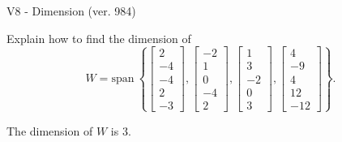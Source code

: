 \begin{exercise}
  \begin{exerciseTitle}V8 - Dimension (ver. 984)\end{exerciseTitle}
  \begin{exerciseStatement}
    Explain how to find the dimension of 
\[W=\mathrm{span}\ \left\{\left[\begin{array}{r}
2 \\
-4 \\
-4 \\
2 \\
-3
\end{array}\right] , \left[\begin{array}{r}
-2 \\
1 \\
0 \\
-4 \\
2
\end{array}\right] , \left[\begin{array}{r}
1 \\
3 \\
-2 \\
0 \\
3
\end{array}\right] , \left[\begin{array}{r}
4 \\
-9 \\
4 \\
12 \\
-12
\end{array}\right]\right\}.\]



  \end{exerciseStatement}
  \begin{exerciseAnswer}
   The dimension of \(W\) is  \(3\).
  


  \end{exerciseAnswer}
\end{exercise}
